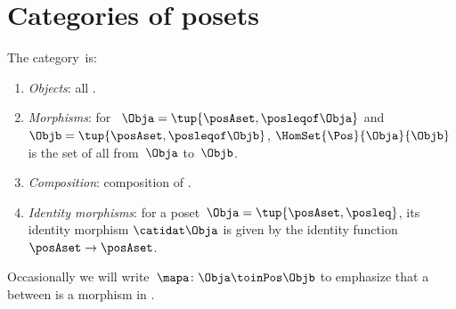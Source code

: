 
\section[Categories of posets]{Categories of posets}
\label{sec:category-Pos}

\begin{ctdefinition}
    \label{def:Pos}
    The category~\Pos is:
    \begin{enumerate}
        \item \emph{Objects}: all .
        \item \emph{Morphisms}: for ~$\Obja = \tup{\posAset, {{\posleqof\Obja}}}$ and $\Objb = \tup{\posAset, {{\posleqof\Objb}}}$,  $\HomSet{\Pos}{\Obja}{\Objb}$ is the set of all  from~$\Obja$ to~$\Objb$.
        \item \emph{Composition}: composition of .
        \item \emph{Identity morphisms}: for a poset~$\Obja = \tup{\posAset, {{\posleq}}}$, its identity morphism $\catidat\Obja$ is given by the identity function $\posAset \to \posAset$.
    \end{enumerate}
\end{ctdefinition}

Occasionally we will write~$\mapa \colon \Obja \toinPos \Objb$ to emphasize that a  between  is a morphism in \Pos.
